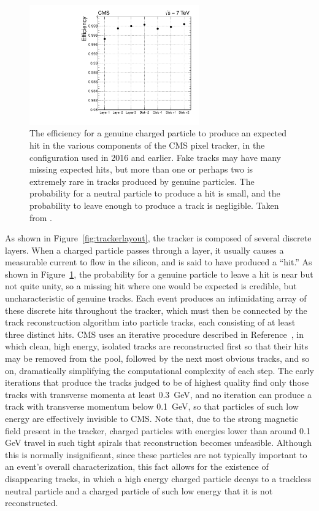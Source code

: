   \begin{figure}[h!]
    \centering
    \includegraphics[width=0.65\textwidth]{figures/hitefficiency.pdf}
    \caption[Efficiency for a genuine particle to leave an expected hit in the CMS tracker.]{
      The efficiency for a genuine charged particle to produce an expected hit in the various components of the CMS pixel tracker, in the configuration used in 2016 and earlier. 
      Fake tracks may have many missing expected hits, but more than one or perhaps two is extremely rare in tracks produced by genuine particles.
      The probability for a neutral particle to produce a hit is small, and the probability to leave enough to produce a track is negligible.
      Taken from \cite{cmstracking}.}
    \label{fig:hitefficiency}
  \end{figure}  

  As shown in Figure~\ref{fig:trackerlayout}, the tracker is composed of several discrete layers.
  When a charged particle passes through a layer, it usually causes a measurable current to flow in the silicon, and is said to have produced a ``hit.''  
  As shown in Figure~\ref{fig:hitefficiency}, the probability for a genuine particle to leave a hit is near but not quite unity, so a missing hit where one would be expected is credible, but uncharacteristic of genuine tracks.
  Each event produces an intimidating array of these discrete hits throughout the tracker, which must then be connected by the track reconstruction algorithm into particle tracks, each consisting of at least three distinct hits.
  CMS uses an iterative procedure described in Reference~\cite{cmstracking}, in which clean, high energy, isolated tracks are reconstructed first so that their hits may be removed from the pool, followed by the next most obvious tracks, and so on, dramatically simplifying the computational complexity of each step.
  The early iterations that produce the tracks judged to be of highest quality find only those tracks with transverse momenta at least 0.3~GeV, and no iteration can produce a track with transverse momentum below 0.1~GeV, so that particles of such low energy are effectively invisible to CMS.
  Note that, due to the strong magnetic field present in the tracker, charged particles with energies lower than around 0.1 GeV travel in such tight spirals that reconstruction becomes unfeasible.
  Although this is normally insignificant, since these particles are not typically important to an event's overall characterization, this fact allows for the existence of disappearing tracks, in which a high energy charged particle decays to a trackless neutral particle and a charged particle of such low energy that it is not reconstructed.

